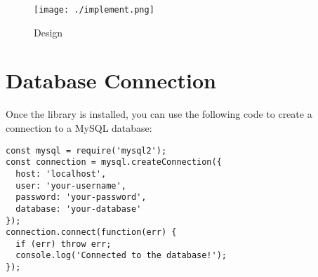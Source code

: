 \begin{figure}[H]
  \caption{Design}
  \texttt{[image: ./implement.png]}
  \\[0.2in]
\end{figure}


\section{Database Connection}
Once the library is installed, you can use the following code to create a connection to a MySQL database:\\
\begin{verbatim}
const mysql = require('mysql2');
const connection = mysql.createConnection({
  host: 'localhost',
  user: 'your-username',
  password: 'your-password',
  database: 'your-database'
});
connection.connect(function(err) {
  if (err) throw err;
  console.log('Connected to the database!');
});
\end{verbatim}



